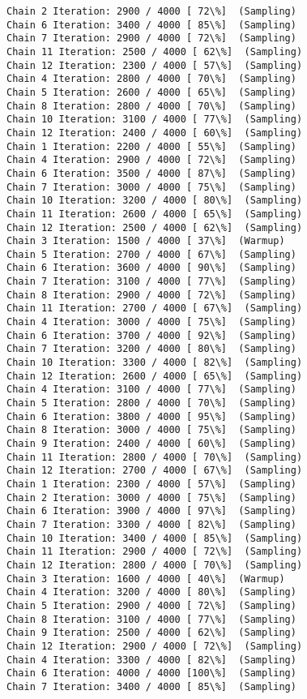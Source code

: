 \documentclass[11pt]{article}
\begin{document}
\begin{Verbatim}[commandchars=\\\{\}]
Chain 2 Iteration: 2900 / 4000 [ 72\%]  (Sampling)
Chain 6 Iteration: 3400 / 4000 [ 85\%]  (Sampling)
Chain 7 Iteration: 2900 / 4000 [ 72\%]  (Sampling)
Chain 11 Iteration: 2500 / 4000 [ 62\%]  (Sampling)
Chain 12 Iteration: 2300 / 4000 [ 57\%]  (Sampling)
Chain 4 Iteration: 2800 / 4000 [ 70\%]  (Sampling)
Chain 5 Iteration: 2600 / 4000 [ 65\%]  (Sampling)
Chain 8 Iteration: 2800 / 4000 [ 70\%]  (Sampling)
Chain 10 Iteration: 3100 / 4000 [ 77\%]  (Sampling)
Chain 12 Iteration: 2400 / 4000 [ 60\%]  (Sampling)
Chain 1 Iteration: 2200 / 4000 [ 55\%]  (Sampling)
Chain 4 Iteration: 2900 / 4000 [ 72\%]  (Sampling)
Chain 6 Iteration: 3500 / 4000 [ 87\%]  (Sampling)
Chain 7 Iteration: 3000 / 4000 [ 75\%]  (Sampling)
Chain 10 Iteration: 3200 / 4000 [ 80\%]  (Sampling)
Chain 11 Iteration: 2600 / 4000 [ 65\%]  (Sampling)
Chain 12 Iteration: 2500 / 4000 [ 62\%]  (Sampling)
Chain 3 Iteration: 1500 / 4000 [ 37\%]  (Warmup)
Chain 5 Iteration: 2700 / 4000 [ 67\%]  (Sampling)
Chain 6 Iteration: 3600 / 4000 [ 90\%]  (Sampling)
Chain 7 Iteration: 3100 / 4000 [ 77\%]  (Sampling)
Chain 8 Iteration: 2900 / 4000 [ 72\%]  (Sampling)
Chain 11 Iteration: 2700 / 4000 [ 67\%]  (Sampling)
Chain 4 Iteration: 3000 / 4000 [ 75\%]  (Sampling)
Chain 6 Iteration: 3700 / 4000 [ 92\%]  (Sampling)
Chain 7 Iteration: 3200 / 4000 [ 80\%]  (Sampling)
Chain 10 Iteration: 3300 / 4000 [ 82\%]  (Sampling)
Chain 12 Iteration: 2600 / 4000 [ 65\%]  (Sampling)
Chain 4 Iteration: 3100 / 4000 [ 77\%]  (Sampling)
Chain 5 Iteration: 2800 / 4000 [ 70\%]  (Sampling)
Chain 6 Iteration: 3800 / 4000 [ 95\%]  (Sampling)
Chain 8 Iteration: 3000 / 4000 [ 75\%]  (Sampling)
Chain 9 Iteration: 2400 / 4000 [ 60\%]  (Sampling)
Chain 11 Iteration: 2800 / 4000 [ 70\%]  (Sampling)
Chain 12 Iteration: 2700 / 4000 [ 67\%]  (Sampling)
Chain 1 Iteration: 2300 / 4000 [ 57\%]  (Sampling)
Chain 2 Iteration: 3000 / 4000 [ 75\%]  (Sampling)
Chain 6 Iteration: 3900 / 4000 [ 97\%]  (Sampling)
Chain 7 Iteration: 3300 / 4000 [ 82\%]  (Sampling)
Chain 10 Iteration: 3400 / 4000 [ 85\%]  (Sampling)
Chain 11 Iteration: 2900 / 4000 [ 72\%]  (Sampling)
Chain 12 Iteration: 2800 / 4000 [ 70\%]  (Sampling)
Chain 3 Iteration: 1600 / 4000 [ 40\%]  (Warmup)
Chain 4 Iteration: 3200 / 4000 [ 80\%]  (Sampling)
Chain 5 Iteration: 2900 / 4000 [ 72\%]  (Sampling)
Chain 8 Iteration: 3100 / 4000 [ 77\%]  (Sampling)
Chain 9 Iteration: 2500 / 4000 [ 62\%]  (Sampling)
Chain 12 Iteration: 2900 / 4000 [ 72\%]  (Sampling)
Chain 4 Iteration: 3300 / 4000 [ 82\%]  (Sampling)
Chain 6 Iteration: 4000 / 4000 [100\%]  (Sampling)
Chain 7 Iteration: 3400 / 4000 [ 85\%]  (Sampling)

\end{Verbatim}
\end{document}
